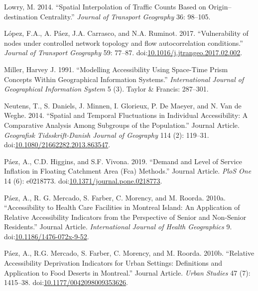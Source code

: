 \documentclass[]{elsarticle} %
\begin{document}
\hypertarget{ref-Lowry2014}{}
Lowry, M. 2014. ``Spatial Interpolation of Traffic Counts Based on
Origin--destination Centrality.'' \emph{Journal of Transport Geography}
36: 98--105.

\hypertarget{ref-Lopez2017}{}
López, F.A., A. Páez, J.A. Carrasco, and N.A. Ruminot. 2017.
``Vulnerability of nodes under controlled network topology and flow
autocorrelation conditions.'' \emph{Journal of Transport Geography} 59:
77--87.
doi:\href{https://doi.org/10.1016/j.jtrangeo.2017.02.002}{10.1016/j.jtrangeo.2017.02.002}.

\hypertarget{ref-miller1991modelling}{}
Miller, Harvey J. 1991. ``Modelling Accessibility Using Space-Time Prism
Concepts Within Geographical Information Systems.'' \emph{International
Journal of Geographical Information System} 5 (3). Taylor \& Francis:
287--301.

\hypertarget{ref-Neutens2014spatial}{}
Neutens, T., S. Daniels, J. Minnen, I. Glorieux, P. De Maeyer, and N.
Van de Weghe. 2014. ``Spatial and Temporal Fluctuations in Individual
Accessibility: A Comparative Analysis Among Subgroups of the
Population.'' Journal Article. \emph{Geografisk Tidsskrift-Danish
Journal of Geography} 114 (2): 119--31.
doi:\href{https://doi.org/10.1080/21662282.2013.863547}{10.1080/21662282.2013.863547}.

\hypertarget{ref-Paez2019demand}{}
Páez, A., C.D. Higgins, and S.F. Vivona. 2019. ``Demand and Level of
Service Inflation in Floating Catchment Area (Fca) Methods.'' Journal
Article. \emph{PloS One} 14 (6): e0218773.
doi:\href{https://doi.org/10.1371/journal.pone.0218773}{10.1371/journal.pone.0218773}.

\hypertarget{ref-Paez2010healthcare}{}
Páez, A., R. G. Mercado, S. Farber, C. Morency, and M. Roorda. 2010a.
``Accessibility to Health Care Facilities in Montreal Island: An
Application of Relative Accessibility Indicators from the Perspective of
Senior and Non-Senior Residents.'' Journal Article. \emph{International
Journal of Health Geographics} 9.
doi:\href{https://doi.org/10.1186/1476-072x-9-52}{10.1186/1476-072x-9-52}.

\hypertarget{ref-Paez2010fooddeserts}{}
Páez, A., R.G. Mercado, S. Farber, C. Morency, and M. Roorda. 2010b.
``Relative Accessibility Deprivation Indicators for Urban Settings:
Definitions and Application to Food Deserts in Montreal.'' Journal
Article. \emph{Urban Studies} 47 (7): 1415--38.
doi:\href{https://doi.org/10.1177/0042098009353626}{10.1177/0042098009353626}.
\end{document}
